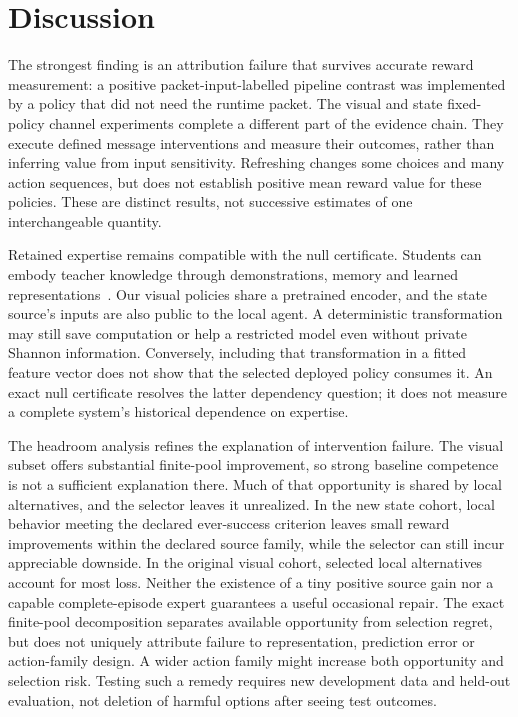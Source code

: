 \section{Discussion}\label{sec:discussion}
The strongest finding is an attribution failure that survives accurate reward measurement: a positive packet-input-labelled pipeline contrast was implemented by a policy that did not need the runtime packet. The visual and state fixed-policy channel experiments complete a different part of the evidence chain. They execute defined message interventions and measure their outcomes, rather than inferring value from input sensitivity. Refreshing changes some choices and many action sequences, but does not establish positive mean reward value for these policies. These are distinct results, not successive estimates of one interchangeable quantity.

Retained expertise remains compatible with the null certificate. Students can embody teacher knowledge through demonstrations, memory and learned representations~\cite{zhu,ilhan,silva}. Our visual policies share a pretrained encoder, and the state source's inputs are also public to the local agent. A deterministic transformation may still save computation or help a restricted model even without private Shannon information. Conversely, including that transformation in a fitted feature vector does not show that the selected deployed policy consumes it. An exact null certificate resolves the latter dependency question; it does not measure a complete system's historical dependence on expertise.

The headroom analysis refines the explanation of intervention failure. The visual subset offers substantial finite-pool improvement, so strong baseline competence is not a sufficient explanation there. Much of that opportunity is shared by local alternatives, and the selector leaves it unrealized. In the new state cohort, local behavior meeting the declared ever-success criterion leaves small reward improvements within the declared source family, while the selector can still incur appreciable downside. In the original visual cohort, selected local alternatives account for most loss. Neither the existence of a tiny positive source gain nor a capable complete-episode expert guarantees a useful occasional repair. The exact finite-pool decomposition separates available opportunity from selection regret, but does not uniquely attribute failure to representation, prediction error or action-family design. A wider action family might increase both opportunity and selection risk. Testing such a remedy requires new development data and held-out evaluation, not deletion of harmful options after seeing test outcomes.

